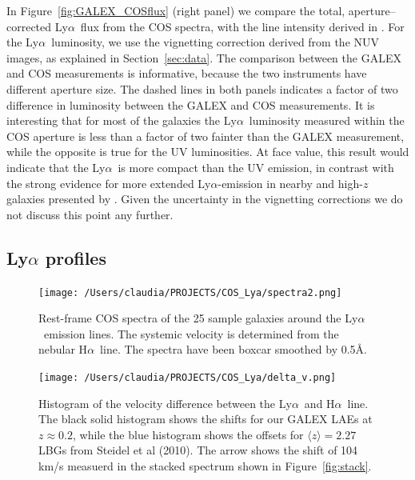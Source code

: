 \documentclass[manuscript]{emulateapj}
\newcommand{\lya}{Ly$\alpha$}
\newcommand{\ha}{H$\alpha$}
\begin{document}
In Figure~\ref{fig:GALEX_COSflux} (right panel) we compare the
total, aperture--corrected \lya\ flux from the COS spectra, with the
line intensity derived in \citet{cowie2011}. For the \lya\ luminosity,
we use the vignetting correction derived from the NUV images, as
explained in Section~\ref{sec:data}. The comparison between the GALEX
and COS measurements is informative, because the two instruments have
different aperture size. The dashed lines in both panels indicates a
factor of two difference in luminosity between the GALEX and COS
measurements. It is interesting that for most of the galaxies the
\lya\ luminosity measured within the COS aperture is less than a
factor of two fainter than the GALEX measurement, while the opposite
is true for the UV luminosities. At face value, this result would
indicate that the \lya\ is more compact than the UV emission, in
contrast with the strong evidence for more extended \lya-emission in
nearby and high-$z$ galaxies presented by \citet[e.g., ]{hayes2013,
  steidelXXX, hayesXXX}. Given the uncertainty in the vignetting
corrections we do not discuss this point any further.

\subsection{Ly$\alpha$ profiles}

\begin{center}
\begin{figure}[h!]
 \texttt{[image: /Users/claudia/PROJECTS/COS\_Lya/spectra2.png]}
   \caption{Rest-frame COS spectra of the 25 sample galaxies around the \lya\
     emission lines. The systemic velocity is determined from the
     nebular \ha\ line. The spectra have been boxcar smoothed by 0.5\AA. }
  \label{fig:spectra_lya}
\end{figure}
\end{center}

\begin{figure}[h!]
   \centering
   \texttt{[image: /Users/claudia/PROJECTS/COS\_Lya/delta\_v.png]}
   \caption{Histogram of the velocity difference between the \lya\ and
     \ha\ line. The black solid histogram shows the shifts for our
     GALEX LAEs at $z\approx 0.2$, while the blue histogram shows the
     offsets for $\langle z \rangle=2.27$ LBGs from Steidel et al
     (2010). The arrow shows the shift of 104 km/s measuerd in the
     stacked spectrum shown in Figure~\ref{fig:stack}.}
   \label{fig:histvel}
\end{figure}
\end{document}
